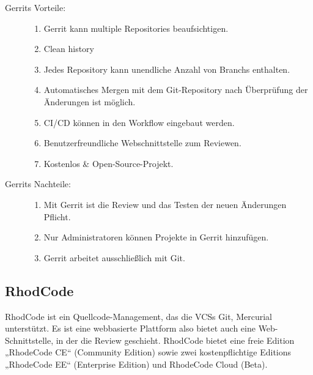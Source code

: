 \begin{description}
	\item [Gerrits Vorteile:] \hfill
	\begin{enumerate}
		\item Gerrit kann multiple Repositories beaufsichtigen.
		\item Clean history 
		\item Jedes Repository kann unendliche Anzahl von Branchs enthalten.
		\item Automatisches Mergen mit dem Git-Repository nach Überprüfung der Änderungen ist möglich.
		\item \ac{CI}/\ac{CD} können in den Workflow eingebaut werden.
		\item Benutzerfreundliche Webschnittstelle zum Reviewen.
		\item Kostenlos \& Open-Source-Projekt.
	\end{enumerate}
	
	\item [Gerrits Nachteile:] \hfill
	\begin{enumerate}
		\item Mit Gerrit ist die Review und das Testen der neuen Änderungen Pflicht.
		\item Nur Administratoren können Projekte in Gerrit hinzufügen.
		\item Gerrit arbeitet ausschließlich mit Git.
	\end{enumerate}
\end{description}

\subsection{RhodCode}
\label{subsec:RhodeCode}

RhodCode ist ein Quellcode-Management, das die \acp{VCS} Git, Mercurial unterstützt. Es ist eine webbasierte Plattform also bietet auch eine Web-Schnittstelle, in der die Review geschieht.
RhodCode bietet eine freie Edition „RhodeCode CE“ (Community Edition) sowie zwei kostenpflichtige Editions „RhodeCode EE“ (Enterprise Edition) und RhodeCode Cloud (Beta).

